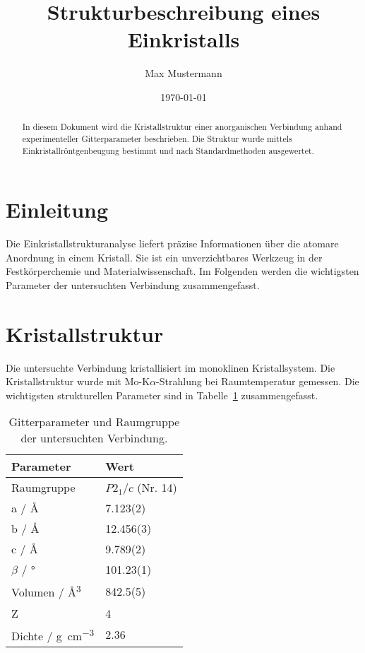\documentclass[11pt,a4paper,twocolumn]{article}
\title{\textbf{Strukturbeschreibung eines Einkristalls}}
\author{Max Mustermann}
\date{\today}
\begin{document}
\maketitle
  \begin{abstract}
    In diesem Dokument wird die Kristallstruktur einer anorganischen Verbindung anhand experimenteller Gitterparameter beschrieben. Die Struktur wurde mittels Einkristallröntgenbeugung bestimmt und nach Standardmethoden ausgewertet.
  \end{abstract}
  \vspace{1em}


\section*{Einleitung}

Die Einkristallstrukturanalyse liefert präzise Informationen über die atomare Anordnung in einem Kristall. Sie ist ein unverzichtbares Werkzeug in der Festkörperchemie und Materialwissenschaft. Im Folgenden werden die wichtigsten Parameter der untersuchten Verbindung zusammengefasst.

\section*{Kristallstruktur}

Die untersuchte Verbindung kristallisiert im monoklinen Kristallsystem. Die Kristallstruktur wurde mit Mo-K\(\alpha\)-Strahlung bei Raumtemperatur gemessen. Die wichtigsten strukturellen Parameter sind in Tabelle~\ref{tab:struktur} zusammengefasst.

\begin{table}[h!]
\centering
\caption{Gitterparameter und Raumgruppe der untersuchten Verbindung.}
\label{tab:struktur}
\begin{tabular}{@{}ll@{}}
\toprule
\textbf{Parameter}         & \textbf{Wert}                        \\
\midrule
Raumgruppe                 & $P2_1/c$ (Nr. 14)                   \\
a / \si{\angstrom}         & 7.123(2)                            \\
b / \si{\angstrom}         & 12.456(3)                           \\
c / \si{\angstrom}         & 9.789(2)                            \\
$\beta$ / \si{\degree}     & 101.23(1)                           \\
Volumen / \si{\angstrom^3} & 842.5(5)                            \\
Z                          & 4                                   \\
Dichte / \si{\gram\per\cubic\centi\metre} & 2.36                  \\
\bottomrule
\end{tabular}
\end{table}
\end{document}
